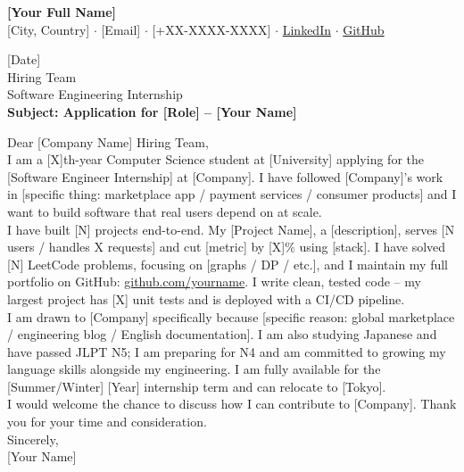 \documentclass[11pt, letterpaper]{article}
\begin{document}
\begin{center}
  {\LARGE\bfseries [Your Full Name]}\\[4pt]
  {\small [City, Country] $\cdot$ [Email] $\cdot$ [+XX-XXXX-XXXX] $\cdot$%
   \href{https://linkedin.com/in/yourname}{LinkedIn} $\cdot$%
   \href{https://github.com/yourname}{GitHub}}
\end{center}

\vspace{14pt}

[Date]\\[8pt]

Hiring Team\\
[Company Name] Software Engineering Internship\\
[Company Address if known]

\vspace{10pt}
\textbf{Subject: Application for [Role] -- [Your Name]}

\vspace{10pt}
Dear [Company Name] Hiring Team,\\[8pt]

I am a [X]th-year Computer Science student at [University] applying for
the [Software Engineer Internship] at [Company]. I have followed [Company]'s
work in [specific thing: marketplace app / payment services / consumer
products] and I want to build software that real users depend on at scale.\\[8pt]

I have built [N] projects end-to-end. My [Project Name], a [description],
serves [N users / handles X requests] and cut [metric] by [X]\% using
[stack]. I have solved [N] LeetCode problems, focusing on [graphs / DP /
etc.], and I maintain my full portfolio on GitHub:
\href{https://github.com/yourname}{github.com/yourname}. I write clean,
tested code -- my largest project has [X] unit tests and is deployed with
a CI/CD pipeline.\\[8pt]

I am drawn to [Company] specifically because [specific reason: global
marketplace / engineering blog / English documentation]. I am also studying
Japanese and have passed JLPT N5; I am preparing for N4 and am committed to
growing my language skills alongside my engineering. I am fully available
for the [Summer/Winter] [Year] internship term and can relocate to [Tokyo].\\[8pt]

I would welcome the chance to discuss how I can contribute to [Company].
Thank you for your time and consideration.\\[14pt]

Sincerely,\\[4pt]
[Your Name]
\end{document}
